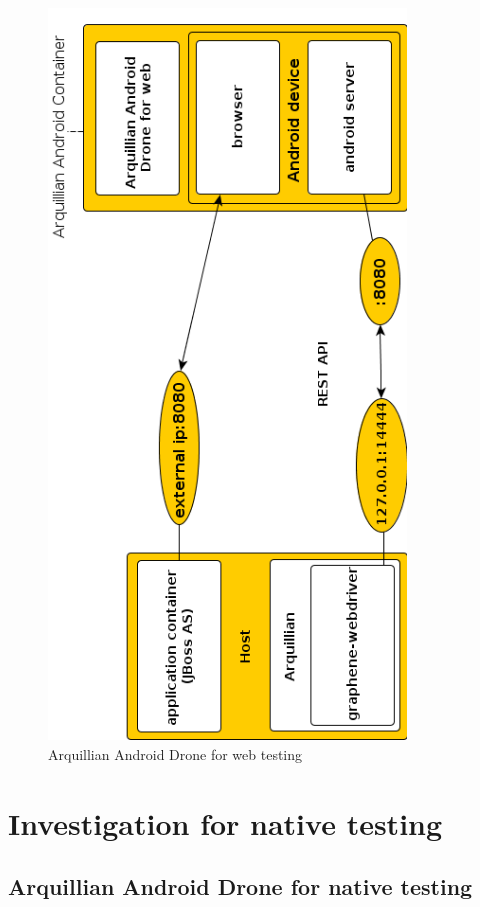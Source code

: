 \documentclass[12pt,final,oneside]{fithesis}
\begin{document}
\begin{figure}[!ht]
	\centering
	\includegraphics[origin=c,width=95mm]{img/webdriver2.png}
	\caption{Arquillian Android Drone for web testing}
	\label{fig:arquillian_drone_web}
\end{figure}

\chapter{Investigation for native testing}

	\section{Arquillian Android Drone for native testing}


\printindex

%

\appendix
\end{document}
